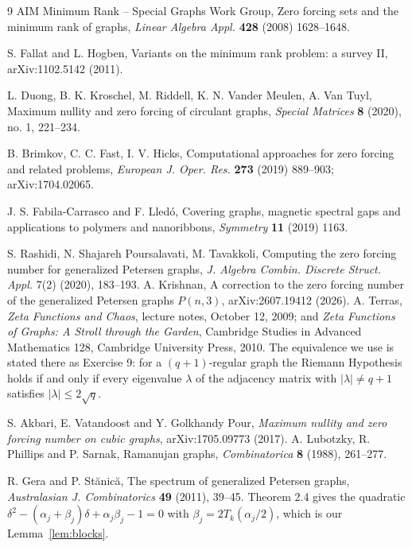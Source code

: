 \documentclass[11pt]{article}
\theoremstyle{definition}
\begin{document}
\begin{thebibliography}{9}
 AIM Minimum Rank -- Special Graphs Work Group,
Zero forcing sets and the minimum rank of graphs,
\emph{Linear Algebra Appl.} \textbf{428} (2008) 1628--1648.

 S. Fallat and L. Hogben, Variants on the minimum rank problem:
a survey II, arXiv:1102.5142 (2011).

 L. Duong, B. K. Kroschel, M. Riddell, K. N. Vander Meulen,
A. Van Tuyl, Maximum nullity and zero forcing of circulant graphs,
\emph{Special Matrices} \textbf{8} (2020), no. 1, 221--234.

 B. Brimkov, C. C. Fast, I. V. Hicks, Computational approaches
for zero forcing and related problems, \emph{European J. Oper. Res.}
\textbf{273} (2019) 889--903; arXiv:1704.02065.

 J. S. Fabila-Carrasco and F. Lled\'o, Covering graphs, magnetic
spectral gaps and applications to polymers and nanoribbons,
\emph{Symmetry} \textbf{11} (2019) 1163.

 S. Rashidi, N. Shajareh Poursalavati, M. Tavakkoli,
Computing the zero forcing number for generalized Petersen graphs,
\emph{J. Algebra Combin. Discrete Struct. Appl.} 7(2) (2020), 183--193.
 A. Krishnan, A correction to the zero forcing number of the
generalized Petersen graphs $P(n,3)$, arXiv:2607.19412 (2026).
 A. Terras, \emph{Zeta Functions and Chaos},
  lecture notes, October 12, 2009; and \emph{Zeta Functions of Graphs: A Stroll
  through the Garden}, Cambridge Studies in Advanced Mathematics 128,
  Cambridge University Press, 2010. The equivalence we use is stated there as
  Exercise 9: for a $(q+1)$-regular graph the Riemann Hypothesis holds if and
  only if every eigenvalue $\lambda$ of the adjacency matrix with
  $|\lambda|\ne q+1$ satisfies $|\lambda|\le2\sqrt q$.

 S. Akbari, E. Vatandoost and Y. Golkhandy Pour,
\emph{Maximum nullity and zero forcing number on cubic graphs},
arXiv:1705.09773 (2017).
 A. Lubotzky, R. Phillips and P. Sarnak, Ramanujan graphs,
  \emph{Combinatorica} \textbf{8} (1988), 261--277.

 R. Gera and P. St\u{a}nic\u{a}, The spectrum of generalized
  Petersen graphs, \emph{Australasian J. Combinatorics} \textbf{49} (2011),
  39--45. Theorem 2.4 gives the quadratic
  $\delta^2-(\alpha_j+\beta_j)\delta+\alpha_j\beta_j-1=0$ with
  $\beta_j=2T_k(\alpha_j/2)$, which is our Lemma~\ref{lem:blocks}.


\end{thebibliography}
\end{document}
